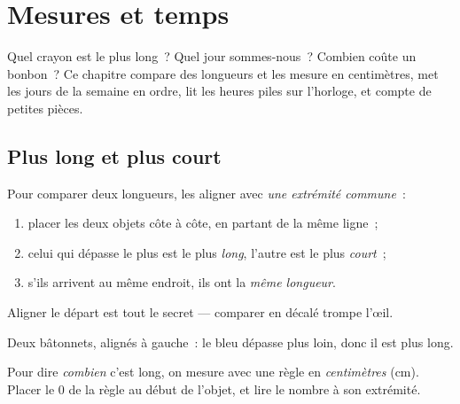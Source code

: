 \chapter{Mesures et temps}\label{ch:g1:measure}

Quel crayon est le plus long~? Quel jour sommes-nous~? Combien
coûte un bonbon~? Ce chapitre compare des longueurs et les mesure
en centimètres, met les jours de la semaine en ordre, lit les
heures piles sur l'horloge, et compte de petites pièces.

\section{Plus long et plus court}

\begin{method}\label{met:g1:measure:compare}
Pour comparer deux longueurs, les aligner avec \emph{une extrémité
commune}~:
\begin{enumerate}
  \item placer les deux objets côte à côte, en partant de la
        même ligne~;
  \item celui qui dépasse le plus est le plus \emph{long}, l'autre
        est le plus \emph{court}~;
  \item s'ils arrivent au même endroit, ils ont la \emph{même
        longueur}.
\end{enumerate}
Aligner le départ est tout le secret --- comparer en décalé
trompe l'œil.
\end{method}

\begin{omfigure}

{\small Deux bâtonnets, alignés à gauche~: le bleu dépasse
plus loin, donc il est plus long.}
\end{omfigure}

\begin{definition}[Le centimètre]\label{def:g1:measure:cm}
Pour dire \emph{combien} c'est long, on mesure avec une règle en
\emph{centimètres} (cm). Placer le $0$ de la règle au début de
l'objet, et lire le nombre à son extrémité.
\end{definition}

